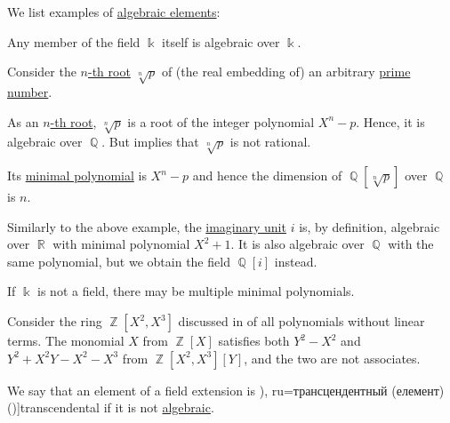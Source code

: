 \begin{example}\label{ex:def:algebraic_element}
  We list examples of \hyperref[def:algebraic_element]{algebraic elements}:
  \begin{thmenum}
     Any member of the field \( \Bbbk \) itself is algebraic over \( \Bbbk \).

     Consider the \hyperref[def:principal_nonnegative_nth_root]{\( n \)-th root} \( \sqrt[n]{ p } \) of (the real embedding of) an arbitrary \hyperref[def:prime_number]{prime number}.

    As an \hyperref[def:nth_root]{\( n \)-th root}, \( \sqrt[n]{ p } \) is a root of the integer polynomial \( X^n - p \). Hence, it is algebraic over \( \BbbQ \). But  implies that \( \sqrt[n]{ p } \) is not rational.

    Its \hyperref[def:algebraic_element_minimal_polynomial]{minimal polynomial} is \( X^n - p \) and hence the dimension of \( \BbbQ[\sqrt[n]{ p }] \) over \( \BbbQ \) is \( n \).

     Similarly to the above example, the \hyperref[def:complex_numbers]{imaginary unit} \( i \) is, by definition, algebraic over \( \BbbR \) with minimal polynomial \( X^2 + 1 \). It is also algebraic over \( \BbbQ \) with the same polynomial, but we obtain the field \( \BbbQ[i] \) instead.

     If \( \Bbbk \) is not a field, there may be multiple minimal polynomials.

    Consider the ring \( \BbbZ[X^2, X^3] \) discussed in  of all polynomials without linear terms. The monomial \( X \) from \( \BbbZ[X] \) satisfies both \( Y^2 - X^2 \) and \( Y^2 + X^2Y - X^2 - X^3 \) from \( \BbbZ[X^2, X^3][Y] \), and the two are not associates.
  \end{thmenum}
\end{example}

\begin{definition}\label{def:transcendental_element}
  We say that an element of a field extension is \term[bg=трансцендентен (елемент) (\cite[423]{Обрешков1962ВисшаАлгебра}), ru=трансцендентный (елемент) (\cite[407]{Винберг2014КурсАлгебры})]{transcendental} if it is not \hyperref[def:algebraic_element]{algebraic}.
\end{definition}

